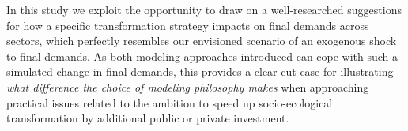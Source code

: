 In this study we exploit the opportunity to draw on a well-researched suggestions for how a specific transformation strategy impacts on final demands across sectors, which perfectly resembles our envisioned scenario of an exogenous shock to final demands. As both modeling approaches introduced can cope with such a simulated change in final demands, this provides a clear-cut case for illustrating \textit{what difference the choice of modeling philosophy makes} when approaching practical issues related to the ambition to speed up socio-ecological transformation by additional public or private investment.


